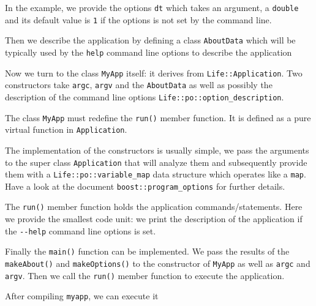 \documentclass[a4paper]{book}
\begin{document}


In the example, we provide the options \lstinline!dt! which takes an
argument, a \lstinline!double! and its default value is \lstinline!1!
if the options is not set by the command line.

Then we describe the application by defining a class
\lstinline!AboutData! which will be typically used by the
\lstinline!help! command line options to describe the application





Now we turn to the class \lstinline!MyApp! itself: it derives from
\lstinline!Life::Application!. Two constructors take \lstinline!argc!,
\lstinline!argv! and the \lstinline!AboutData! as well as possibly the
description of the command line options \lstinline!Life::po::option_description!.

The class \lstinline!MyApp! must redefine the \lstinline!run()! member
function. It is defined as a pure virtual function in
\lstinline!Application!.




The implementation of the constructors is usually simple, we pass the
arguments to the super class \lstinline!Application! that will analyze
them and subsequently provide them with a
\lstinline!Life::po::variable_map! data structure which operates like
a \lstinline!map!. Have a look at the document
\lstinline!boost::program_options! for further details.



The \lstinline!run()! member function holds the application
commands/statements. Here we provide the smallest code unit: we print
the description of the application if the \lstinline!--help! command
line options is set.



Finally the \lstinline!main()! function can be implemented. We pass
the results of the \lstinline!makeAbout()! and
\lstinline!makeOptions()! to the constructor of \lstinline!MyApp! as
well as \lstinline!argc! and \lstinline!argv!. Then we call the
\lstinline!run()! member function to execute the application.



After compiling \lstinline!myapp!, we can execute it
\end{document}
